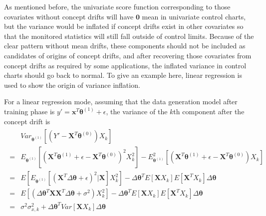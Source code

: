 \documentclass[twoside,11pt]{article}
\begin{document}
As mentioned before, the univariate score function corresponding to those covariates without concept drifts will have $\bm{0}$ mean in univariate control charts, but the variance would be inflated if concept drifts exist in other covariates so that the monitored statistics will still fall outside of control limits. Because of the clear pattern without mean drifts, these components should not be included as candidates of origins of concept drifts, and after recovering those covariates from concept drifts as required by some applications, the inflated variance in control charts should go back to normal. To give an example here, linear regression is used to show the origin of variance inflation.

For a linear regression mode, assuming that the data generation model after training phase is $y' = \bm {x}^T\bm { \theta}^{ (1)} + \epsilon$, the variance of the $k$th component after the concept drift is
\begin{align}
\begin{aligned}
&Var _{ \bm{ \theta}^{(1)}}[ (Y'- \bm {X}^T \bm{\theta}^{(0)}  ) X_{k}]   \\
= & E _{\bm{ \theta}^{(1)}} [(\bm {X}^T \bm{\theta}^{(1)}+\epsilon -  \bm {X}^T \bm{\theta}^{(0)}  )^2 X_{k}^2] - E _{\bm{ \theta}^{(1)}}^2 [(\bm {X}^T \bm{\theta}^{(1)}+\epsilon - \bm {X}^T \bm{\theta}^{(0)}) X_{k}]   \\
= & E   [E _{\bm{ \theta}^{(1)}}[(\bm {X}^T\Delta \bm { \theta}  +\epsilon)^2|\bm {X}] X_{k}^2] - \Delta \bm{\theta}^T E   [\bm {X}  X_{k}]E   [\bm {X} ^T X_{k}] \Delta \bm { \theta}    \\
= & E   [ (\Delta \bm { \theta}^T \bm {X} \bm {X} ^T \Delta \bm { \theta} + \sigma^2)X_{k}^2] - \Delta \bm{\theta}^T E   [\bm {X}  X_{k}]E   [\bm {X} ^T X_{k}] \Delta \bm { \theta}    \\
= & \sigma^2 \sigma_{x,k}^2 + \Delta \bm{\theta}^TVar [\bm {X}  X_{k}] \Delta \bm{\theta}
\end{aligned}
\label{eqn:var_aft_cd}
\end{align}
\end{document}
